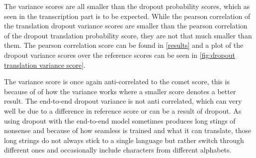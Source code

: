 The variance scores are all smaller than the dropout probability scores, which as seen in the transcription part is to be expected. While the pearson correlation of the translation dropout variance scores are smaller than the pearson correlation of the dropout translation probability score, they are not that much smaller than them. The pearson correlation score can be found in \autoref{results} and a plot of the dropout variance scores over the reference scores can be seen in \autoref{fig:dropout translation variance score}.

The variance score is once again anti-correlated to the comet score, this is because of of how the variance works where a smaller score denotes a better result. 
The end-to-end dropout variance is not anti correlated, which can very well be due to a difference in reference score or can be a result of dropout.
As using dropout with the end-to-end model sometimes produces long stings of nonsense and because of how seamless is trained and what it can translate, those long strings do not always stick to a single language but rather switch through different ones and occasionally include characters from different alphabets. 
